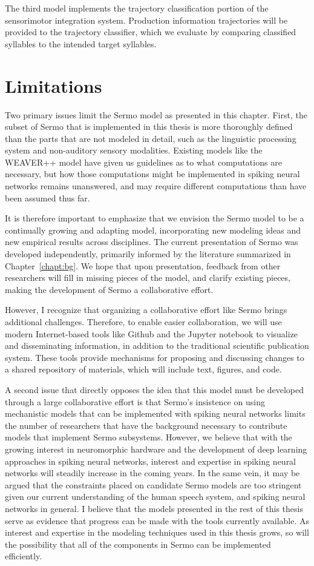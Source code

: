 The third model implements
the trajectory classification portion
of the sensorimotor integration system.
Production information trajectories
will be provided to the trajectory classifier,
which we evaluate by
comparing classified syllables
to the intended target syllables.

\section{Limitations}

Two primary issues limit the Sermo model
as presented in this chapter.
First, the subset of Sermo
that is implemented in this thesis
is more thoroughly defined than
the parts that are not modeled in detail,
such as the linguistic processing system
and non-auditory sensory modalities.
Existing models like the WEAVER++ model
have given us guidelines as to
what computations are necessary,
but how those computations might be implemented
in spiking neural networks
remains unanswered,
and may require different computations
than have been assumed thus far.

It is therefore important to emphasize
that we envision the Sermo model
to be a continually growing and adapting model,
incorporating new modeling ideas
and new empirical results
across disciplines.
The current presentation of Sermo
was developed independently,
primarily informed by the literature
summarized in Chapter~\ref{chapt:bg}.
We hope that upon presentation,
feedback from other researchers will
fill in missing pieces of the model,
and clarify existing pieces,
making the development of Sermo
a collaborative effort.

However, I recognize that
organizing a collaborative effort
like Sermo brings additional challenges.
Therefore, to enable easier collaboration,
we will use modern Internet-based tools
like Github and the Jupyter notebook
to visualize
and disseminating information,
in addition to the traditional
scientific publication system.
These tools provide mechanisms
for proposing and discussing changes
to a shared repository of materials,
which will include text, figures, and code.

A second issue that directly opposes
the idea that this model must be
developed through a large collaborative effort
is that Sermo's insistence on
using mechanistic models that
can be implemented with spiking neural networks
limits the number of researchers
that have the background necessary
to contribute models that implement
Sermo subsystems.
However, we believe that with the growing
interest in neuromorphic hardware
and the development of deep learning approaches
in spiking neural networks,
interest and expertise in spiking neural networks
will steadily increase in the coming years.
In the same vein, it may be argued that
the constraints placed on candidate Sermo models
are too stringent given our current understanding
of the human speech system,
and spiking neural networks in general.
I believe that the models presented
in the rest of this thesis
serve as evidence that
progress can be made with
the tools currently available.
As interest and expertise in
the modeling techniques used
in this thesis grows,
so will the possibility
that all of the components in Sermo
can be implemented efficiently.
